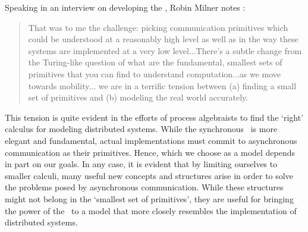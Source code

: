 Speaking in an interview on developing the \picalc, Robin Milner notes \cite{miln03}:
\begin{quote}
That was to me the challenge: picking communication primitives which could be understood at a reasonably high level as well as in the way these systems are implemented at a very low level...There's a subtle change from the Turing-like question of what are the fundamental, smallest sets of primitives that you can find to understand computation...as we move towards mobility... we are in a terrific tension between (a) finding a small set of primitives and (b) modeling the real world accurately.
\end{quote}
This tension is quite evident in the efforts of process algebraists to find the `right' calculus for modeling distributed systems.  
While the synchronous \picalc\ is more elegant and fundamental, actual implementations must commit to asynchronous communication as their primitives.  
Hence, which we choose as a model depends in part on our goals.  
In any case, it is evident that by limiting ourselves to smaller calculi, many useful new concepts and structures arise in order to solve the problems posed by asynchronous communication.  
While these structures might not belong in the `smallest set of primitives', they are useful for bringing the power of the \picalc\ to a model that more closely resembles the implementation of distributed systems.